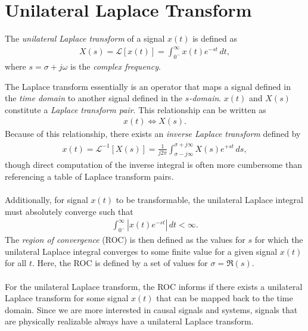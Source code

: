\documentclass{report}
\begin{document}
\section{Unilateral Laplace Transform}
\begin{tcolorbox}[width=\textwidth,colback={white}, sharp corners]
    The \emph{unilateral Laplace transform} of a signal $x(t)$ is defined as  
    \begin{align}
        X(s) = \mathcal{L}[x(t)] = \int_{0^-}^{\infty} x(t) e^{-st} \,dt,
    \end{align}
    where $s=\sigma + j\omega$ is the \emph{complex frequency}. 
\end{tcolorbox}
\noindent The Laplace transform essentially is an operator that maps a signal defined in the \emph{time domain} to another signal 
defined in the \emph{$s$-domain}. $x(t)$ and $X(s)$ constitute a \emph{Laplace transform pair}. This relationship can be written as 
\begin{align}
    x(t) \iff X(s).
\end{align}
Because of this relationship, there exists an \emph{inverse Laplace transform} defined by 
\begin{align}
    x(t) = \mathcal{L}^{-1}[X(s)] = \frac{1}{j2\pi}\int_{\sigma-j\infty}^{\sigma+j\infty} X(s) e^{+st} \,ds,
\end{align}
though direct computation of the inverse integral is often more cumbersome than referencing a table of Laplace transform pairs.
\\ \\
Additionally, for signal $x(t)$ to be transformable, the unilateral Laplace integral must absolutely converge such that 
\begin{align}
    \int_{0^-}^{\infty} |x(t) e^{-st}| \,dt < \infty. 
\end{align}
The \emph{region of convergence} (ROC) is then defined as the values for $s$ for which the unilateral Laplace integral converges to some finite value  
for a given signal $x(t)$ for all $t$. Here, the ROC is defined by a set of values for $\sigma = \Re(s)$.
\\ \\
For the unilateral Laplace transform, the ROC informs if there exists a unilateral Laplace transform for some signal $x(t)$ that can be mapped back to the time domain. 
Since we are more interested in causal signals and systems, signals that are physically realizable always have a unilateral Laplace transform. 
\\ \\
\end{document}
